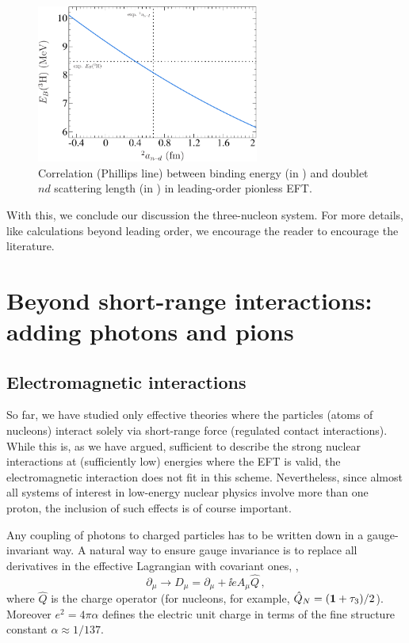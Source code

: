 \begin{figure}[tb]
\centering
\includegraphics[width=0.65\textwidth,clip]{Phillips}
\caption{Correlation (Phillips line) between \Triton binding energy (in \MeV)
and doublet $nd$ scattering length (in \fm) in leading-order pionless EFT.}
\label{fig:Phillips}
\end{figure}

\medskip
With this, we conclude our discussion the three-nucleon system.  For more 
details, like calculations beyond leading order, we encourage the reader to 
encourage the literature.

%
\section{Beyond short-range interactions: adding photons and pions}
\label{sec:EFT-Beyond}

\subsection{Electromagnetic interactions}
\label{sec:EFT-EM}

So far, we have studied only effective theories where the particles (atoms of 
nucleons) interact solely via short-range force (regulated contact 
interactions).  While this is, as we have argued, sufficient to describe the 
strong nuclear interactions at (sufficiently low) energies where the EFT is 
valid, the electromagnetic interaction does not fit in this scheme.  
Nevertheless, since almost all systems of interest in low-energy nuclear 
physics involve more than one proton, the inclusion of such effects 
is of course important.

Any coupling of photons to charged particles has to be written down in a 
gauge-invariant way.  A natural way to ensure gauge invariance is to replace 
all derivatives in the effective Lagrangian with covariant ones, \ie,
%
\begin{equation}
 \partial_\mu \rightarrow D_\mu = \partial_\mu + \ii eA_\mu \hat{Q} \,,
\label{eq:D-mu}
\end{equation}
%
where $\hat{Q}$ is the charge operator (for nucleons, for example, 
$\hat{Q}_N=(\mathbf{1}+\tau_3)/2$).  Moreover $e^2 = 4\pi\alpha$ defines the electric 
unit charge in terms of the fine structure constant $\alpha\approx1/137$.

